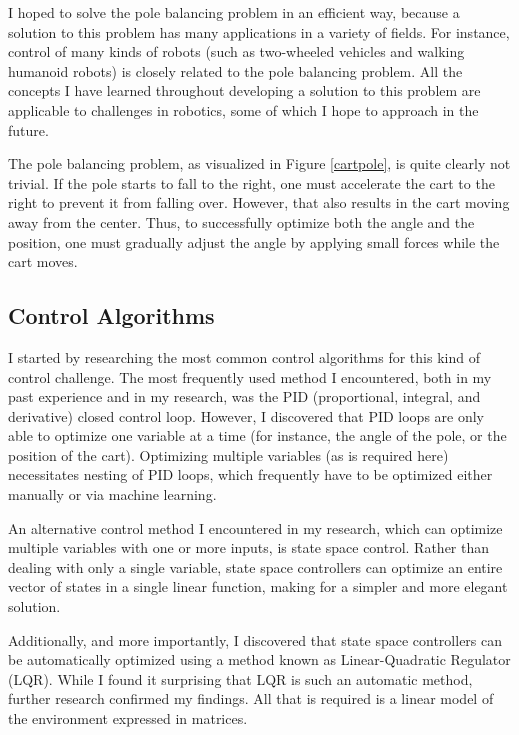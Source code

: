 \documentclass[11pt]{article}
\begin{document}
I hoped to solve the pole balancing problem in an efficient way, because a solution to this problem has many applications in a variety of fields. For instance, control of many kinds of robots (such as two-wheeled vehicles and walking humanoid robots) is closely related to the pole balancing problem. All the concepts I have learned throughout developing a solution to this problem are applicable to challenges in robotics, some of which I hope to approach in the future.

The pole balancing problem, as visualized in Figure \ref{cartpole}, is quite clearly not trivial. If the pole starts to fall to the right, one must accelerate the cart to the right to prevent it from falling over. However, that also results in the cart moving away from the center. Thus, to successfully optimize both the angle and the position, one must gradually adjust the angle by applying small forces while the cart moves.

\subsection{Control Algorithms}

I started by researching the most common control algorithms for this kind of control challenge. The most frequently used method I encountered, both in my past experience and in my research, was the PID (proportional, integral, and derivative) closed control loop. However, I discovered that PID loops are only able to optimize one variable at a time (for instance, the angle of the pole, or the position of the cart). Optimizing multiple variables (as is required here) necessitates nesting of PID loops, which frequently have to be optimized either manually or via machine learning.

An alternative control method I encountered in my research, which can optimize multiple variables with one or more inputs, is state space control. Rather than dealing with only a single variable, state space controllers can optimize an entire vector of states in a single linear function, making for a simpler and more elegant solution.

Additionally, and more importantly, I discovered that state space controllers can be automatically optimized using a method known as Linear-Quadratic Regulator (LQR). While I found it surprising that LQR is such an automatic method, further research confirmed my findings. All that is required is a linear model of the environment expressed in matrices.
\end{document}
